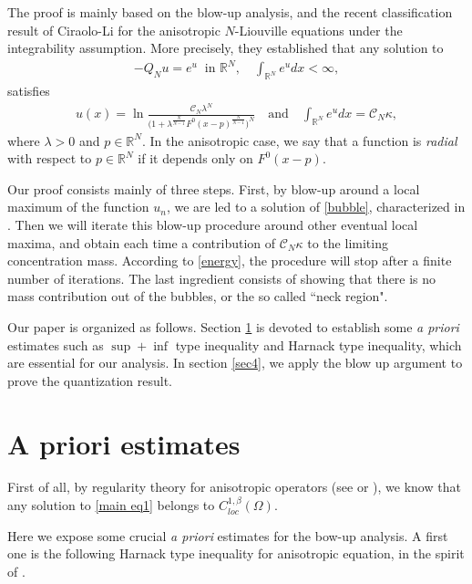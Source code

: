 \documentclass[11pt]{amsart}
\numberwithin{equation}{section}
\newcommand{\R}{\mathbb{R}}
\begin{document}
The proof is mainly based on the blow-up analysis, and the recent classification result of Ciraolo-Li \cite{CL2023} for the anisotropic $N$-Liouville equations under the integrability assumption. More precisely, they established that any solution to
\begin{align}
\label{bubble}
-Q_{N}u=e^u \;\;\mbox{in } \mathbb{R}^{N},\quad \int_{\mathbb{R}^{N}}e^{u}dx<\infty,
\end{align}
satisfies
\begin{align}
\label{bubble1}
u(x)=\ln\frac{\mathcal{C}_{N}\lambda^{N}}{\Big(1+\lambda^{\frac{N}{N-1}} F^{0}(x-p)^{\frac{N}{N-1}}\Big)^{N}} \quad\mbox{and}\quad \int_{\mathbb{R}^{N}}e^{u}dx=\mathcal{C}_{N}\kappa,
\end{align}
where $\lambda > 0$ and $p\in\mathbb{R}^{N}$. In the anisotropic case, we say that a function is {\it radial} with respect to $p \in \R^N$ if it depends only on $F^{0}(x-p)$.

\medskip
Our proof consists mainly of three steps. First, by blow-up around a local maximum of the function $u_n$, we are led to a solution of \eqref{bubble}, characterized in \cite{CL2023}. Then we will iterate this blow-up procedure around other eventual local maxima, and obtain each time a contribution of $\mathcal{C}_N \kappa$ to the limiting concentration mass. According to \eqref{energy}, the procedure will stop after a finite number of iterations. The last ingredient consists of showing that there is no mass contribution out of the bubbles, or the so called ``neck region".

Our paper is organized as follows. Section \ref{sec3} is devoted to establish some {\it a priori} estimates such as {\bf$\sup+\inf$} type inequality and Harnack type inequality, which are essential for our analysis. In section \ref{sec4}, we apply the blow up argument to prove the quantization result.


\section{A priori estimates}\label{sec3}
First of all, by regularity theory for anisotropic operators (see \cite{D1983, S1964} or \cite[Proposition 2.2]{CL2023}), we know that any solution to \eqref{main eq1} belongs to $C^{1, \beta}_{loc}(\Omega)$.

Here we expose some crucial {\it a priori} estimates for the bow-up analysis. A first one is the following Harnack type inequality for anisotropic equation, in the spirit of \cite[Theorem 3.1]{KM1992}.
\end{document}

